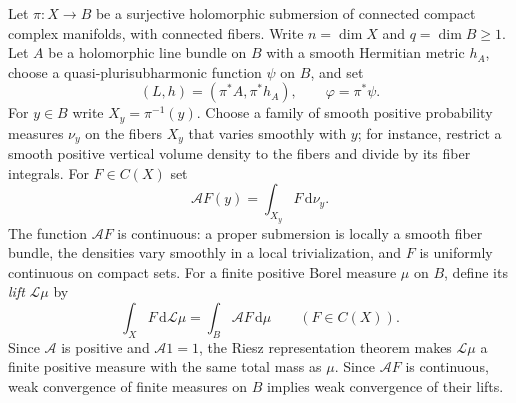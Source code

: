 Let $\pi\colon X\to B$ be a surjective holomorphic submersion of connected compact complex manifolds, with connected fibers. Write $n=\dim X$ and $q=\dim B\geq1$. Let $A$ be a holomorphic line bundle on $B$ with a smooth Hermitian metric $h_A$, choose a quasi-plurisubharmonic function $\psi$ on $B$, and set
\[
 (L,h)=(\pi^*A,\pi^*h_A),\qquad \varphi=\pi^*\psi.
\]
For $y\in B$ write $X_y=\pi^{-1}(y)$. Choose a family of smooth positive probability measures $\nu_y$ on the fibers $X_y$ that varies smoothly with $y$; for instance, restrict a smooth positive vertical volume density to the fibers and divide by its fiber integrals. For $F\in C(X)$ set
\[
 \mathcal A F(y)=\int_{X_y}F\,\mathrm{d}\nu_y.
\]
The function $\mathcal A F$ is continuous: a proper submersion is locally a smooth fiber bundle, the densities vary smoothly in a local trivialization, and $F$ is uniformly continuous on compact sets. For a finite positive Borel measure $\mu$ on $B$, define its \emph{lift} $\mathcal L\mu$ by
\[
 \int_X F\,\mathrm{d}\mathcal L\mu=\int_B\mathcal A F\,\mathrm{d}\mu
 \qquad(F\in C(X)).
\]
Since $\mathcal A$ is positive and $\mathcal A1=1$, the Riesz representation theorem makes $\mathcal L\mu$ a finite positive measure with the same total mass as $\mu$. Since $\mathcal AF$ is continuous, weak convergence of finite measures on $B$ implies weak convergence of their lifts.

